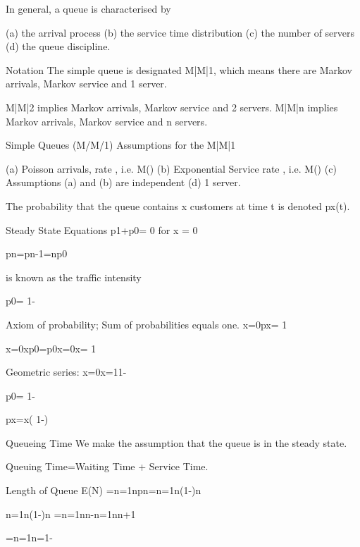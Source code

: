 
In general, a queue is characterised by

(a) the arrival process
(b) the service time distribution
(c) the number of servers
(d) the queue discipline.


Notation
The simple queue is designated M|M|1, which means there are Markov arrivals, Markov service and 1 server. 

M|M|2 implies Markov arrivals, Markov service and 2 servers. M|M|n implies Markov arrivals, Markov service and n servers.


Simple Queues (M/M/1)
Assumptions for the M|M|1

(a) Poisson arrivals, rate , i.e. M()
(b) Exponential Service rate , i.e. M()
(c) Assumptions (a) and (b) are independent
(d) 1 server.

The probability that the queue contains x customers at time t is denoted px(t).

Steady State Equations
p1+p0= 0 for x = 0

pn=pn-1=np0

 is known as the traffic intensity

p0= 1-

		
Axiom of probability; Sum of probabilities equals one.
x=0px= 1  
	                       
		
x=0xp0=p0x=0x= 1

Geometric series: x=0x=11-

p0= 1-

px=x( 1-)

Queueing Time  
We make the assumption that the queue is in the steady state.

	Queuing Time=Waiting Time + Service Time.

Length of Queue
E(N) =n=1npn=n=1n(1-)n

		n=1n(1-)n =n=1nn-n=1nn+1
		
	      
		 =n=1n=1-



